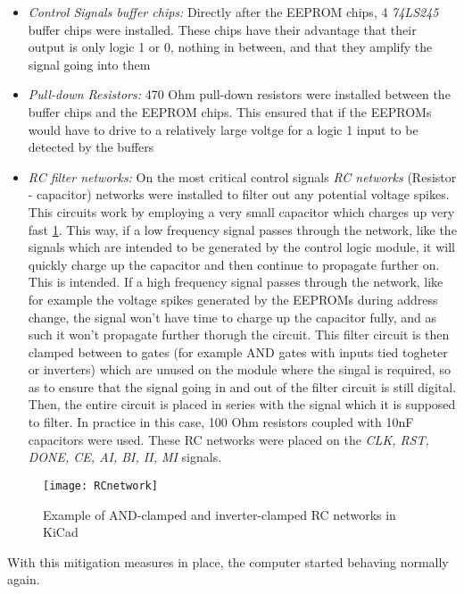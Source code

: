 \begin{itemize}
  \item \emph{Control Signals buffer chips: } Directly after the EEPROM chips, 4 \emph{74LS245}
  \cite{74ls245} buffer chips were installed. These chips have their advantage that their output
  is only logic 1 or 0, nothing in between, and that they amplify the signal going into them
  \item \emph{Pull-down Resistors: } 470 Ohm pull-down resistors were installed between the
  buffer chips and the EEPROM chips. This ensured that if the EEPROMs would have to drive to a
  relatively large voltge for a logic 1 input to be detected by the buffers
  \item \emph{RC filter networks: } On the most critical control signals \emph{RC networks}
  (Resistor - capacitor) networks were installed to filter out any potential voltage spikes.
  This circuits work by employing a very small capacitor which charges up very fast \ref{RCnet1}.
  This way, if a low frequency signal passes through the network, like the signals which are
  intended to be generated by the control logic module, it will quickly charge up the capacitor
  and then continue to propagate further on. This is intended. If a high frequency signal passes
  through the network, like for example the voltage spikes generated by the EEPROMs during address
  change, the signal won't have time to charge up the capacitor fully, and as such it won't
  propagate further thorugh the circuit. This filter circuit is then clamped between to
  gates (for example AND gates with inputs tied togheter or inverters) which are unused on the
  module where the singal is required, so as to ensure that the signal going in and out of the
  filter circuit is still digital. Then, the entire circuit is placed in series with the signal
  which it is supposed to filter. In practice in this case, 100 Ohm  resistors coupled with 10nF
  capacitors were used. These RC networks were placed on the \emph{CLK, RST, DONE, CE, AI, BI,
  II, MI} signals.
\end{itemize}

\begin{figure}[ht]
  \centering
  \texttt{[image: RCnetwork]}
  \caption{Example of AND-clamped and inverter-clamped RC networks in KiCad}
  \label{RCnet1}
\end{figure}

With this mitigation measures in place, the computer started behaving normally again.
